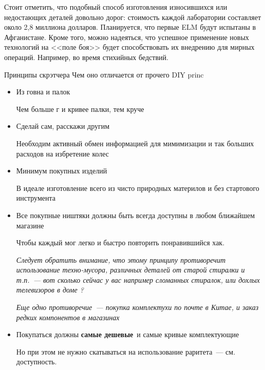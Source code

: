 \begin{news}{2}

Стоит отметить, что подобный способ изготовления износившихся или недостающих
деталей довольно дорог: стоимость каждой лаборатории составляет около 2,8
миллиона долларов. Планируется, что первые ELM будут испытаны в Афганистане.
Кроме того, можно надеяться, что успешное применение новых технологий на <<поле
боя>> будет способствовать их внедрению для мирных операций. Например, во время
стихийных бедствий.

\end{news}

\begin{editorial}{1}
	{Принципы скрэтчера}
	{Чем оно отличается от прочего DIY}
	{princ}
	
\begin{itemize}
  
\item Из говна и палок
  
Чем больше г и кривее палки, тем круче \scr
  
\item Сделай сам, расскажи другим
  
Необходим активный обмен информацией для мимимизации и так больших расходов на
избретение колес
  
\item Минимум покупных изделий

В идеале изготовление всего из чисто природных материлов и без стартового
инструмента

\item Все покупные ништяки должны быть всегда доступны в любом ближайшем
магазине

Чтобы каждый мог легко и быстро повторить понравившийся хак.

\emph{Следует обратить внимание, что этому принципу противоречит использование
техно-мусора, различных деталей от старой стиралки и т.п.\ --- вот сколько
сейчас у вас например сломанных стиралок, или дохлых телевизоров в доме ?}

\emph{Еще одно противоречие\ --- покупка комплектухи по почте в Китае, и заказ
редких компонентов в магазинах}

\item Покупаться должны \textbf{самые дешевые}\ и самые кривые
комплектующие

Но при этом не нужно скатываться на использование раритета\ --- см. доступность.


\end{itemize}
\end{editorial}
